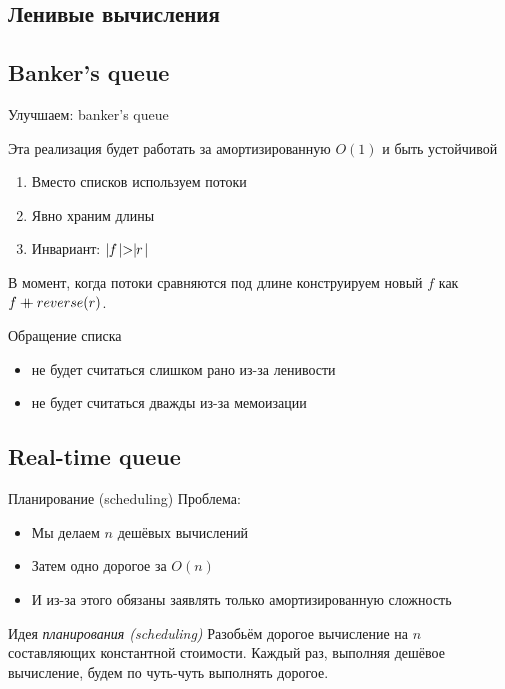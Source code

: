 \subsection{Ленивые вычисления}


\subsection{Banker's queue}

\begin{frame}{Улучшаем: banker's queue}
\begin{remark}
Эта реализация будет работать за амортизированную $O(1)$ и быть устойчивой
\end{remark}


\begin{enumerate}
\item Вместо списков используем потоки 
\item Явно храним длины
\item Инвариант: $\mid\!\!f\!\mid>\mid\!\!r\!\mid$
\end{enumerate}

В момент, когда потоки сравняются под длине конструируем новый $f$ как $f \mathbin{+\mkern-10mu+} reverse(r)$. \vspace{1em}

Обращение списка 
\begin{itemize}
\item не будет считаться слишком рано из-за ленивости
\item не будет считаться дважды из-за мемоизации
\end{itemize}
\end{frame}


\subsection{Real-time queue}
\begin{frame}{Планирование (scheduling)}
Проблема:
\begin{itemize}
\item Мы делаем $n$ дешёвых вычислений
\item Затем одно дорогое за $O(n)$
\item И из-за этого обязаны заявлять только амортизированную сложность
\end{itemize}

\begin{block}{Идея \emph{планирования (scheduling)}}
Разобьём дорогое вычисление на $n$ составляющих константной стоимости. Каждый раз, выполняя дешёвое вычисление, будем по чуть-чуть выполнять дорогое.
\end{block}
\end{frame}

